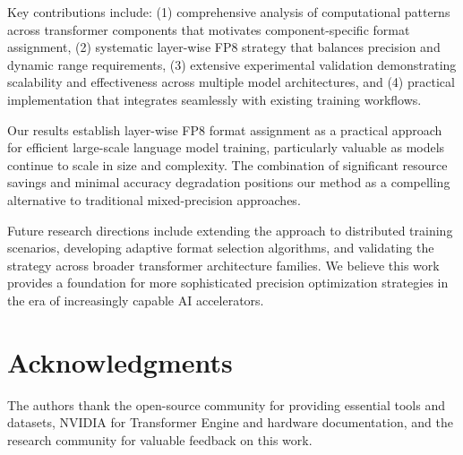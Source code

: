 \documentclass[conference]{IEEEtran}
\begin{document}
Key contributions include: (1) comprehensive analysis of computational patterns across transformer components that motivates component-specific format assignment, (2) systematic layer-wise FP8 strategy that balances precision and dynamic range requirements, (3) extensive experimental validation demonstrating scalability and effectiveness across multiple model architectures, and (4) practical implementation that integrates seamlessly with existing training workflows.

Our results establish layer-wise FP8 format assignment as a practical approach for efficient large-scale language model training, particularly valuable as models continue to scale in size and complexity. The combination of significant resource savings and minimal accuracy degradation positions our method as a compelling alternative to traditional mixed-precision approaches.

Future research directions include extending the approach to distributed training scenarios, developing adaptive format selection algorithms, and validating the strategy across broader transformer architecture families. We believe this work provides a foundation for more sophisticated precision optimization strategies in the era of increasingly capable AI accelerators.

\section*{Acknowledgments}

The authors thank the open-source community for providing essential tools and datasets, NVIDIA for Transformer Engine and hardware documentation, and the research community for valuable feedback on this work.
\end{document}
